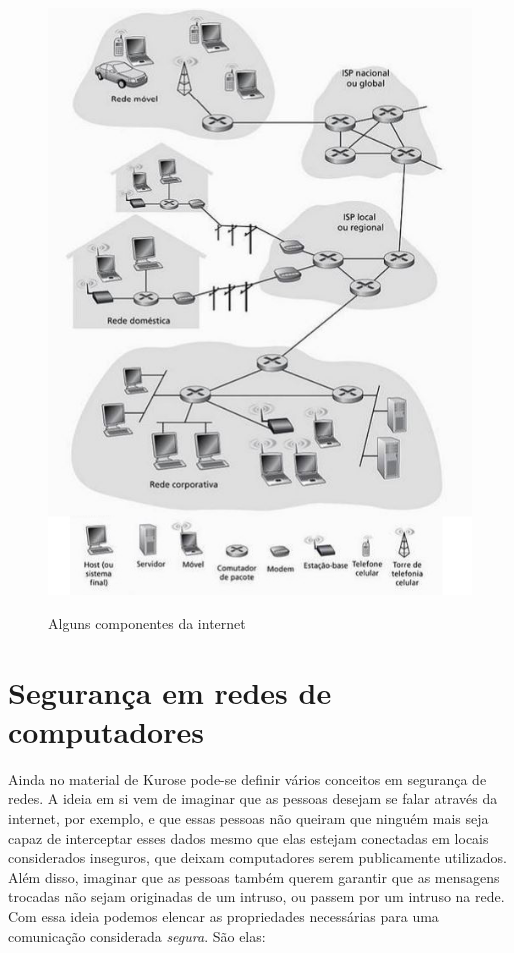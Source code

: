\begin{figure}[H]
\caption{\small Alguns componentes da internet}
\centering
\includegraphics[scale=0.7]{figs/fig3.JPG}
\label{f.internet_01}
\end{figure}




\section{Segurança em redes de computadores}
\label{s.segurança}

Ainda no material de Kurose pode-se definir vários conceitos em segurança de
redes. A ideia em si vem de imaginar que as pessoas desejam se falar através
da internet, por exemplo, e que essas pessoas não queiram que ninguém mais
seja capaz de interceptar esses dados mesmo que elas estejam conectadas em
locais considerados inseguros, que deixam computadores serem publicamente
utilizados. Além disso, imaginar que as pessoas também querem garantir que as
mensagens trocadas não sejam originadas de um intruso, ou passem por um
intruso na rede. Com essa ideia podemos elencar as propriedades necessárias
para uma comunicação considerada \emph{segura}. São elas:


